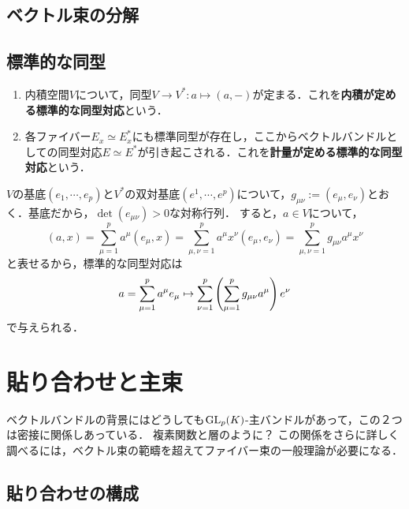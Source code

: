\documentclass[uplatex,dvipdfmx]{jsreport}
\begin{document}
\subsection{ベクトル束の分解}

\subsection{標準的な同型}

\begin{definition}\mbox{}
    \begin{enumerate}
        \item 内積空間$V$について，同型$V\to V^*:a\mapsto(a,-)$が定まる．これを\textbf{内積が定める標準的な同型対応}という．
        \item 各ファイバー$E_x\simeq E_x^*$にも標準同型が存在し，ここからベクトルバンドルとしての同型対応$E\simeq E^*$が引き起こされる．これを\textbf{計量が定める標準的な同型対応}という．
    \end{enumerate}
\end{definition}
\begin{notation}
    $V$の基底$(e_1,\cdots,e_p)$と$V^*$の双対基底$(e^1,\cdots,e^p)$について，$g_{\mu\nu}:=(e_\mu,e_\nu)$とおく．基底だから，$\det(e_{\mu\nu})>0$な対称行列．
    すると，$a\in V$について，
    \[(a,x)=\sum_{\mu=1}^pa^\mu(e_\mu,x)=\sum_{\mu,\nu=1}^pa^\mu x^\nu(e_\mu,e_\nu)=\sum_{\mu,\nu=1}^pg_{\mu\nu}a^\mu x^\nu\]
    と表せるから，標準的な同型対応は
    \[a=\sum^p_{\mu=1}a^\mu e_\mu\mapsto\sum^p_{\nu=1}\left(\sum^p_{\mu=1}g_{\mu\nu}a^\mu\right)e^\nu\]
    で与えられる．
\end{notation}

\section{貼り合わせと主束}

\begin{tcolorbox}[colframe=ForestGreen, colback=ForestGreen!10!white,breakable,colbacktitle=ForestGreen!40!white,coltitle=black,fonttitle=\bfseries\sffamily,
title=]
    ベクトルバンドルの背景にはどうしても$\mathrm{GL}_p(K)$-主バンドルがあって，この２つは密接に関係しあっている．
    複素関数と層のように？
    この関係をさらに詳しく調べるには，ベクトル束の範疇を超えてファイバー束の一般理論が必要になる．
\end{tcolorbox}

\subsection{貼り合わせの構成}
\end{document}
